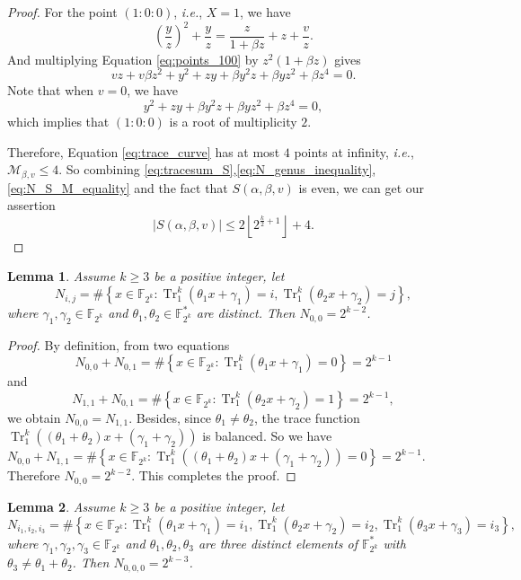 \documentclass{article}
\newcommand{\F}{\mathbb{F}}
\newcommand{\0}{\textbf{0}}
\newcommand{\1}{\textbf{1}}
\newcommand{\TRACE}{\operatorname{Tr}_1^k}
\theoremstyle{plain}
\newtheorem{lemma}{Lemma}
\begin{document}
\begin{proof}
        For the point $(1 : 0 : 0)$, \emph{i.e.}, $X = 1$, we have
        \begin{equation}\label{eq:points_100}
            \left( \frac{y}{z} \right)^2+\frac{y}{z}=\frac{z}{1+\beta z}+z+\frac{v}{z}.
        \end{equation}
        And multiplying Equation \eqref{eq:points_100} by $z^2(1+\beta z)$ gives
        \[vz+v\beta z^2+y^2+zy+\beta y^2z+\beta yz^2+\beta z^4=0.\]
        Note that when $v=0$, we have
        \[y^2+zy+\beta y^2z+\beta yz^2+\beta z^4=0,\]
        which implies that $(1:0:0)$ is a root of multiplicity $2$.

        Therefore, Equation \eqref{eq:trace_curve} has at most $4$ points at infinity, \emph{i.e.},
        $\mathcal{M}_{\beta,v}\le 4$.
        So combining \eqref{eq:tracesum_S},\eqref{eq:N_genus_inequality},\eqref{eq:N_S_M_equality} and the fact that
        $S(\alpha,\beta,v)$ is even, we can get our assertion
        \[\left\lvert S(\alpha,\beta,v)\right\rvert \le 2\left\lfloor 2^{\frac{k}{2}+1}\right\rfloor+4.\]
    \end{proof}

    \begin{lemma}\label{lemma:N_ij_trace}
        Assume  $k\ge 3$ be a positive integer, let
        \[ N_{i,j} =\#\left\{x\in\F_{2^k} : \TRACE\left(\theta_1x+\gamma_1\right)=i,\TRACE\left(\theta_2x+\gamma_2\right)=j\right\}, \]
        where  $\gamma_1,\gamma_2\in\F_{2^k}$ and $\theta_1,\theta_2\in\F_{2^k}^*$ are distinct. Then $N_{0,0} =2^{k-2}$.
    \end{lemma}

   \begin{proof}
        By definition, from two equations
        \[N_{0,0}+N_{0,1}=\#\left\{x\in\F_{2^k} : \TRACE\left(\theta_1x+\gamma_1\right)=0\right\}=2^{k-1}\]
        and
        \[N_{1,1}+N_{0,1}=\#\left\{x\in\F_{2^k} : \TRACE\left(\theta_2x+\gamma_2\right)=1\right\}=2^{k-1},\]
        we obtain $N_{0,0} = N_{1,1}$.
        Besides, since $\theta_1\ne\theta_2$, the trace function $\TRACE\left((\theta_1+\theta_2)x+(\gamma_1+\gamma_2)\right)$ is balanced. 
        So we have $N_{0,0}+N_{1,1} = \#\left\{x\in\F_{2^k} : \TRACE\left((\theta_1+\theta_2)x+(\gamma_1+\gamma_2)\right)=0\right\}=2^{k-1}$.
        Therefore $N_{0,0}=2^{k-2}$. This completes the proof.
   \end{proof}

    \begin{lemma}\label{lemma:N_ijk_trace}
        Assume $k\ge 3$ be a positive integer, let
        \[ N_{i_1,i_2,i_3}=\#\left\{x\in\F_{2^k} :  \TRACE\left(\theta_1x+\gamma_1\right)=i_1,\TRACE\left(\theta_2x+\gamma_2\right)=i_2,\TRACE\left(\theta_3x+\gamma_3\right)=i_3 \right\},\]
        where  $\gamma_1,\gamma_2,\gamma_3\in\F_{2^k}$ and $\theta_1,\theta_2,\theta_3$ are three distinct elements of $\F_{2^k}^*$ with $\theta_3\ne\theta_1+\theta_2$. Then $N_{0,0,0}= 2^{k-3}$.
    \end{lemma}
\end{document}
